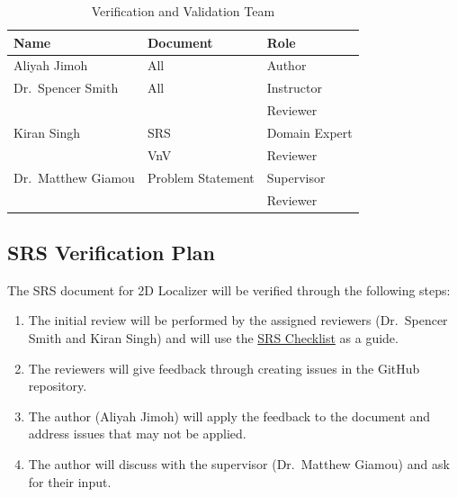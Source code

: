 \documentclass[12pt, titlepage]{article}
\begin{document}
\begin{center}
  \begin{table}[h]
    \centering
    
    \begin{tabular}{|l|l|p{5cm}|}
        \hline
        \textbf{Name} & \textbf{Document} & \textbf{Role} \\
        \hline
        Aliyah Jimoh & All & Author\\
        \hline
        Dr.~Spencer Smith & All & Instructor \\
                          &     & Reviewer\\
        \hline
        Kiran Singh & SRS & Domain Expert\\
                    & VnV & Reviewer      \\
        \hline
        Dr.~Matthew Giamou & Problem Statement & Supervisor \\
                           &                   & Reviewer \\
        \hline
    \end{tabular}

    \caption{Verification and Validation Team}
    \label{table:vnvTeam}
\end{table}
\end{center}

\subsection{SRS Verification Plan}\label{plan_SRS}

The SRS document for 2D Localizer will be verified through the following steps:
\begin{enumerate}
  \item The initial review will be performed by the assigned reviewers (Dr.~Spencer Smith and Kiran Singh) and will use the \href{https://github.com/AliyahJimoh/2D-Localizer/blob/main/docs/Checklists/SRS-Checklist.pdf}{SRS Checklist} as a guide.
  \item The reviewers will give feedback through creating issues in the GitHub repository.
  \item The author (Aliyah Jimoh) will apply the feedback to the document and address issues that may not be applied.
  \item The author will discuss with the supervisor (Dr.~Matthew Giamou) and ask for their input.
\end{enumerate}

\end{document}
